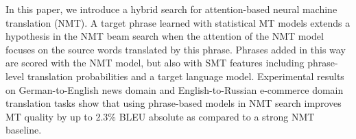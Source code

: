 In this paper, we introduce a hybrid search for attention-based neural machine translation (NMT). A target phrase learned with statistical MT models extends a hypothesis in the NMT beam search when the attention of the NMT model focuses on the source words translated by this phrase. Phrases added in this way are scored with the NMT model, but also with SMT features including phrase-level translation probabilities and a target language model. Experimental results on German-to-English news domain and English-to-Russian e-commerce domain translation tasks show that using phrase-based models in NMT search improves MT quality by up to 2.3\% BLEU absolute as compared to a strong NMT baseline.

